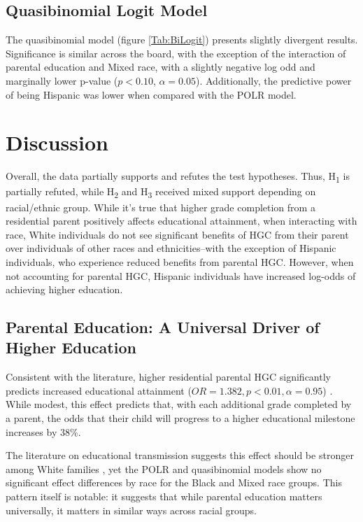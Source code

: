 \documentclass[jou,12pt,floatsintext]{apa7}
\begin{document}
\subsection{Quasibinomial Logit Model}

The quasibinomial model (figure \ref{Tab:BiLogit}) presents slightly divergent results. Significance is similar across the board, with the exception of the interaction of parental education and Mixed race, with a slightly negative log odd and marginally lower p-value ($p < 0.10$, $\alpha = 0.05$). Additionally, the predictive power of being Hispanic was lower when compared with the POLR model.

\section{Discussion}

Overall, the data partially supports and refutes the test hypotheses. Thus, H\textsubscript{1} is partially refuted, while H\textsubscript{2} and H\textsubscript{3} received mixed support depending on racial/ethnic group. While it's true that higher grade completion from a residential parent positively affects educational attainment, when interacting with race, White individuals do not see significant benefits of HGC from their parent over individuals of other races and ethnicities--with the exception of Hispanic individuals, who experience reduced benefits from parental HGC. However, when not accounting for parental HGC, Hispanic individuals have increased log-odds of achieving higher education.

\subsection{Parental Education: A Universal Driver of Higher Education}

Consistent with the literature, higher residential parental HGC significantly predicts increased educational attainment ($OR=1.382, p<0.01, \alpha=0.95$) \parencite{reed_educational_nodate,jones_benefits_2024,assari_parental_2018}. While modest, this effect predicts that, with each additional grade completed by a parent, the odds that their child will progress to a higher educational milestone increases by $38\%$.

The literature on educational transmission suggests this effect should be stronger among White families \parencite{oakes_multiplying_1990, assari_parental_2018}, yet the POLR and quasibinomial models show no significant effect differences by race for the Black and Mixed race groups. This pattern itself is notable: it suggests that while parental education matters universally, it matters in similar ways across racial groups.
\end{document}
